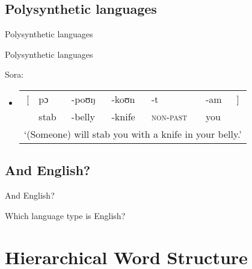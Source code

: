 \documentclass{beamer}
\newcommand{\subonefive}{Polysynthetic languages}
\newcommand{\subonesix}{And English?}
\begin{document}
    \subsection{\subonefive}
      \begin{frame}{\subonefive}
        \begin{alertblock}{Polysynthetic languages}
          
        \end{alertblock}
        \begin{example}
          Sora:
          \begin{itemize}
            \item \begin{tabular}{r @{} l l l l l @{} l}
                    [  & pɔ   & -poʊŋ   & -koʊn   & -t                & -am & ] \\
                       & stab & -belly  & -knife  & \textsc{non-past} & you & \\
                    \multicolumn{7}{l}{`(Someone) will stab you with a knife in your belly.'}
                  \end{tabular}
          \end{itemize}
        \end{example}
      \end{frame}

    \subsection{\subonesix}
      \begin{frame}{\subonesix}
        \begin{block}{Which language type is English?}
        \end{block}
      \end{frame}

  \section{Hierarchical Word Structure}
\end{document}
